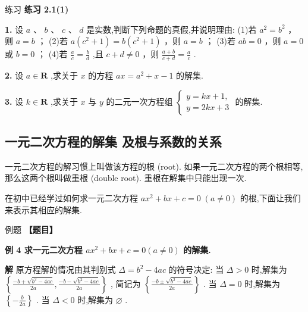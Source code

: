 \documentclass[a4paper,10pt,oneside,fontset=none]{ctexbook}
\newcounter{example}[chapter]
\newenvironment{example}[1][]{\begin{exBox}{例题}{#1}}{\end{exBox}}
\newenvironment{exercise}[1][]{\begin{exBox}{练习}{#1}}{\end{exBox}}
\numberwithin{equation}{chapter}
\newenvironment{solution}{\begin{solutionBox}}{\end{solutionBox}}
\begin{document}
\begin{exercise}
\textbf{练习 2.1(1)}\par\vspace{0.5em}
\textbf{1.} 设 $a\text{ 、 }b\text{ 、 }c\text{ 、 }d$ 是实数,判断下列命题的真假,并说明理由: (1)若 ${a}^{2} = {b}^{2}$ ，则 $a = b$ ； (2)若 $a\left( {{c}^{2} + 1}\right)  = b\left( {{c}^{2} + 1}\right)$ ，则 $a = b$ ； (3)若 ${ab} = 0$ ，则 $a = 0$ 或 $b = 0$ ； (4)若 $\frac{a}{c} = \frac{b}{d}$ ,且 $c + d \neq  0$ ，则 $\frac{a + b}{c + d} = \frac{a}{c}$ .
\par\vspace{0.8em}
\textbf{2.} 设 $a \in  \mathbf{R}$ ,求关于 $x$ 的方程 ${ax} = {a}^{2} + x - 1$ 的解集.
\par\vspace{0.8em}
\textbf{3.} 设 $k \in  \mathbf{R}$ ,求关于 $x$ 与 $y$ 的二元一次方程组 $\left\{  \begin{array}{l} y = {kx} + 1, \\  y = {2kx} + 3 \end{array}\right.$ 的解集.
\end{exercise}

\subsection*{一元二次方程的解集 及根与系数的关系}

一元二次方程的解习惯上叫做该方程的根 (root). 如果一元二次方程的两个根相等, 那么这两个根叫做重根 (double root). 重根在解集中只能出现一次.

在初中已经学过如何求一元二次方程 $a{x}^{2} + {bx} + c = 0 \; \left( {a \neq  0}\right)$ 的根,下面让我们来表示其相应的解集.

\begin{example}
\textbf{【题目】}\par\vspace{0.3em}
\textbf{例 4 求一元二次方程 $a{x}^{2} + {bx} + c = 0\left( {a \neq  0}\right)$ 的解集.}\par\vspace{0.3em}
\end{example}

\begin{solution}
\textbf{解}
原方程解的情况由其判别式 $\Delta  = {b}^{2} - {4ac}$ 的符号决定:
当 $\Delta  > 0$ 时,解集为 $\left\{  {\frac{-b + \sqrt{{b}^{2} - {4ac}}}{2a},\frac{-b - \sqrt{{b}^{2} - {4ac}}}{2a}}\right\}$ , 简记为 $\left\{  \frac{-b \pm  \sqrt{{b}^{2} - {4ac}}}{2a}\right\}$ .
当 $\Delta  = 0$ 时,解集为 $\left\{  {-\frac{b}{2a}}\right\}$ .
当 $\Delta  < 0$ 时,解集为 $\varnothing$ .
\end{solution}
\end{document}
